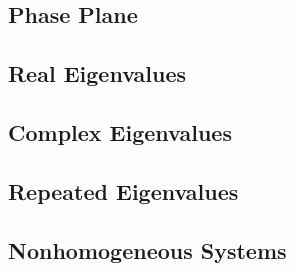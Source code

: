 \documentclass[12pt]{article}
\theoremstyle{definition}
\begin{document}
\subsection{Phase Plane}

\subsection{Real Eigenvalues}

\subsection{Complex Eigenvalues}

\subsection{Repeated Eigenvalues}

\subsection{Nonhomogeneous Systems}
\end{document}
